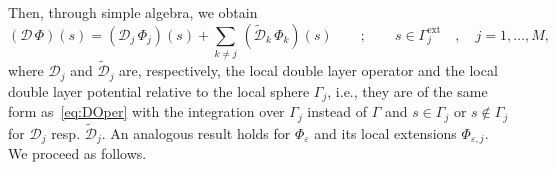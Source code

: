 \documentclass[aip,jcp,a4paper,11pt]{revtex4-1}
\newcommand{\cD}{\mathcal{D}}
\begin{document}
Then, through simple algebra, we obtain
\begin{equation}\label{eq:16}
(\mathcal{D} \, \Phi ) (s) = ( \mathcal{D}_j \, \Phi_j )(s) + \sum_{k \ne j} \,(\tilde{\mathcal{D}}_k \, \Phi_k )(s) \qquad ; \qquad s \in \Gamma_j^\text{ext} \quad, \quad  j = 1 , \ldots , M,
\end{equation}
where $\cD_j$ and $\tilde{\cD}_j$ are, respectively, the local double layer operator and the local double layer potential relative to the local sphere $\Gamma_j$, i.e., they are of the same form as~\eqref{eq:DOper} with the integration over $\Gamma_j$ instead of $\Gamma$ and $s\in\Gamma_j$ or $s\not\in\Gamma_j$ for $\cD_j$ resp. $\tilde{\cD}_j$. 
An analogous result holds for $\Phi_\varepsilon$ and its local extensions $\Phi_{\varepsilon,j}$.  %
We proceed as follows.
\end{document}
